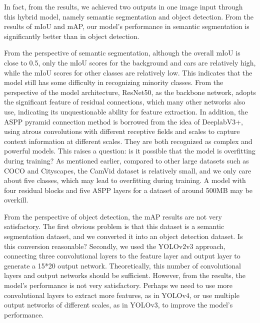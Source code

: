 \documentclass[conference]{IEEEtran}
\begin{document}


In fact, from the results, we achieved two outputs in one image input through this hybrid model, namely semantic segmentation and object detection. From the results of mIoU and mAP, our model's performance in semantic segmentation is significantly better than in object detection.

From the perspective of semantic segmentation, although the overall mIoU is close to 0.5, only the mIoU scores for the background and cars are relatively high, while the mIoU scores for other classes are relatively low. This indicates that the model still has some difficulty in recognizing minority classes. From the perspective of the model architecture, ResNet50, as the backbone network, adopts the significant feature of residual connections, which many other networks also use, indicating its unquestionable ability for feature extraction. In addition, the ASPP pyramid connection method is borrowed from the idea of DeeplabV3+, using atrous convolutions with different receptive fields and scales to capture context information at different scales. They are both recognized as complex and powerful models. This raises a question: is it possible that the model is overfitting during training? As mentioned earlier, compared to other large datasets such as COCO and Cityscapes, the CamVid dataset is relatively small, and we only care about five classes, which may lead to overfitting during training. A model with four residual blocks and five ASPP layers for a dataset of around 500MB may be overkill.

From the perspective of object detection, the mAP results are not very satisfactory. The first obvious problem is that this dataset is a semantic segmentation dataset, and we converted it into an object detection dataset. Is this conversion reasonable? Secondly, we used the YOLOv2v3 approach, connecting three convolutional layers to the feature layer and output layer to generate a 15*20 output network. Theoretically, this number of convolutional layers and output networks should be sufficient. However, from the results, the model's performance is not very satisfactory. Perhaps we need to use more convolutional layers to extract more features, as in YOLOv4, or use multiple output networks of different scales, as in YOLOv3, to improve the model's performance.
\end{document}
